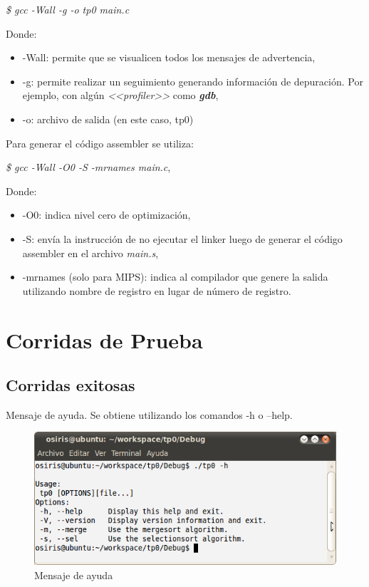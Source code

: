 \documentclass[a4paper,10pt]{article}
\begin{document}
\begin{center}
\textit{\$ gcc -Wall -g -o tp0 main.c}\\
\end{center}

Donde:
\begin{itemize}
\item -Wall: permite que se visualicen todos los mensajes de advertencia, 
\item -g: permite realizar un seguimiento generando información de depuración. Por ejemplo, con algún \textit{<<profiler>>} como \textit{\textbf{gdb}},
\item -o: archivo de salida (en este caso, tp0)
\end{itemize}

Para generar el código assembler se utiliza:\\
\begin{center}
\textit{\$ gcc -Wall -O0 -S -mrnames main.c},
\end{center}

Donde:
\begin{itemize}
\item -O0: indica nivel cero de optimización,
\item -S: envía la instrucción de no ejecutar el linker luego de generar el código assembler en el archivo \textit{main.s},
\item -mrnames (solo para MIPS): indica al compilador que genere la salida utilizando nombre de registro en lugar de número de registro.
\end{itemize}

\newpage
\section{Corridas de Prueba}

\subsection{Corridas exitosas}

Mensaje de ayuda. Se obtiene utilizando los comandos -h o --help.\\

\begin{figure}[!htp]
  \centering
    \includegraphics[width=9 cm]{tp0_opcion_help.png}
  \caption{Mensaje de ayuda}
  \label{Figura1}
\end{figure}
\end{document}
